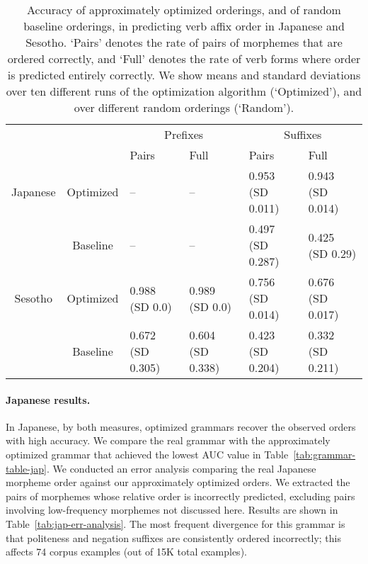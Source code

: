 \begin{table}
\begin{tabular}{cc||ll|ll}
             &              & \multicolumn{2}{c}{Prefixes}    & \multicolumn{2}{|c}{Suffixes} \\
             &              & Pairs & Full & Pairs & Full \\ \hline\hline
Japanese    & Optimized   & -- &  -- &   0.953 (SD 0.011) & 0.943 (SD 0.014) \\ %
             & Baseline    & -- & --  & 0.497 (SD 0.287) & 0.425 (SD 0.29) \\ \hline %
Sesotho &   Optimized  &  0.988 (SD 0.0) & 0.989 (SD 0.0) & 0.756 (SD 0.014) & 0.676 (SD 0.017) \\
&   Baseline  &  0.672 (SD 0.305) & 0.604 (SD 0.338) & 0.423 (SD 0.204) & 0.332 (SD 0.211) \\ 
\end{tabular}
\caption{Accuracy of approximately optimized orderings, and of random baseline orderings, in predicting verb affix order in Japanese and Sesotho. `Pairs' denotes the rate of pairs of morphemes that are ordered correctly, and `Full' denotes the rate of verb forms where order is predicted entirely correctly. We show means and standard deviations over ten different runs of the optimization algorithm (`Optimized'), and over different random orderings (`Random').}\label{tab:morph-acc}
\end{table}

\paragraph{Japanese results.} In Japanese, by both measures, optimized grammars recover the observed orders with high accuracy.
We compare the real grammar with the approximately optimized grammar that achieved the lowest AUC value in Table~\ref{tab:grammar-table-jap}. %
We conducted an error analysis comparing the real Japanese morpheme order against our approximately optimized orders.
We extracted the pairs of morphemes whose relative order is incorrectly predicted, excluding pairs involving low-frequency morphemes not discussed here. 
Results are shown in Table~\ref{tab:jap-err-analysis}.
The most frequent divergence for this grammar is that politeness and negation suffixes are consistently ordered incorrectly; this affects 74 corpus examples (out of 15K total examples).

